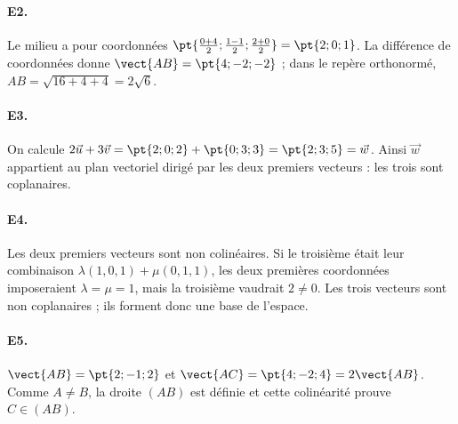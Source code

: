 \paragraph{E2.}Le milieu a pour coordonnées $\pt{\frac{0+4}{2};\frac{1-1}{2};\frac{2+0}{2}}=\pt{2;0;1}$. La différence de coordonnées donne $\vect{AB}=\pt{4;-2;-2}$ ; dans le repère orthonormé, $AB=\sqrt{16+4+4}=2\sqrt6$.

\paragraph{E3.}On calcule $2\vec u+3\vec v=\pt{2;0;2}+\pt{0;3;3}=\pt{2;3;5}=\vec w$. Ainsi $\vec w$ appartient au plan vectoriel dirigé par les deux premiers vecteurs : les trois sont coplanaires.

\paragraph{E4.}Les deux premiers vecteurs sont non colinéaires. Si le troisième était leur combinaison $\lambda(1,0,1)+\mu(0,1,1)$, les deux premières coordonnées imposeraient $\lambda=\mu=1$, mais la troisième vaudrait $2\ne0$. Les trois vecteurs sont non coplanaires ; ils forment donc une base de l'espace.

\paragraph{E5.}$\vect{AB}=\pt{2;-1;2}$ et $\vect{AC}=\pt{4;-2;4}=2\vect{AB}$. Comme $A\ne B$, la droite $(AB)$ est définie et cette colinéarité prouve $C\in(AB)$.


